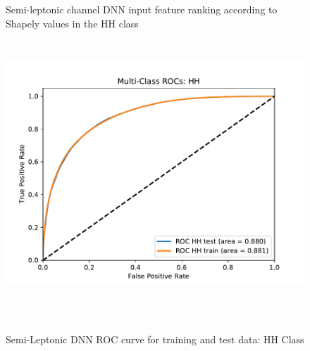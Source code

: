 \begin{figure}[H]
  \setcounter{subfigure}{0}
  \centering
  \caption{Semi-leptonic channel DNN input feature ranking according to Shapely values in the HH class}
  \label{fig:SLfeatureranking_HH}
\end{figure} 

\begin{figure}[H]
  \setlength{\unitlength}{1mm}
  \begin{center}
    \mbox{\includegraphics*[height=100mm]{Sections/HHWWgg/images/DNN/MultiClass_ROC_class_HH.pdf}
    }
  \end{center}
  \caption{Semi-Leptonic DNN ROC curve for training and test data: HH Class}
  \label{fig:ROC_HH}
\end{figure}

